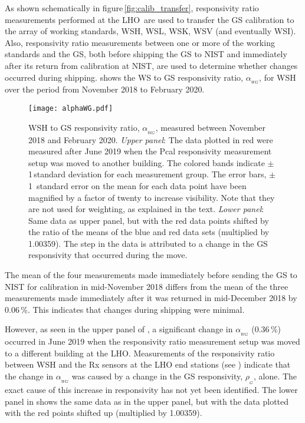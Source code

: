 \documentclass[12pt,a4paper,final]{iopart}
\begin{document}
As shown schematically in figure\,\ref{fig:calib_transfer}, responsivity ratio measurements performed at the LHO\,\cite{in_lab_index} are used to transfer the GS calibration to the array of working standards, WSH, WSL, WSK, WSV (and eventually WSI).  Also, responsivity ratio measurements between one or more of the working standards and the GS, both before shipping the GS to NIST and immediately after its return from calibration at NIST, are used to determine whether changes occurred during shipping.
 shows the WS to GS responsivity ratio, $\alpha_{_{WG}}$, for WSH over the period from November 2018 to February 2020.
%
\begin{figure}[t]%
    \begin{center}
    \texttt{[image: alphaWG.pdf]}
    \caption{WSH to GS responsivity ratio, $\alpha_{_{WG}}$, measured between November 2018 and February 2020. {\em Upper panel}: The data plotted in red were measured after June 2019 when the Pcal responsivity measurement setup was moved to another building.  The colored bands indicate $\pm$ 1\,standard deviation for each measurement group. The error bars, $\pm$\,1\, standard error on the mean for each  data point have been magnified by a factor of twenty to increase visibility.  Note that they are not used for weighting, as explained in the text. {\em Lower panel}: Same data as upper panel, but with the red data points shifted by the ratio of the means of the blue and red data sets (multiplied by 1.00359).  The step in the data is attributed to a change in the GS responsivity that occurred during the move.}
    \label{fig:alphaHG}
    \end{center}
\end{figure}
%
The mean of the four measurements made immediately before sending the GS to NIST for calibration in mid-November 2018 differs from the mean of the three measurements made immediately after it was returned  in mid-December 2018 by 0.06\,\%.  This indicates that changes during shipping were minimal.

However, as seen in the upper panel of , a significant change in $\alpha_{_{WG}}$ (0.36\,\%) occurred in June 2019 when the responsivity ratio measurement setup was moved to a different building at the LHO.  Measurements of the responsivity ratio between WSH and the Rx sensors at the LHO end stations (see ) indicate that the change in $\alpha_{_{WG}}$ was caused by a change in the GS responsivity, $\rho_{_{G}}$, alone.  The exact cause of this increase in responsivity has not yet been identified.  The lower panel in  shows the same data as in the upper panel, but with the data plotted with the red points shifted up (multiplied by 1.00359). 
\end{document}
